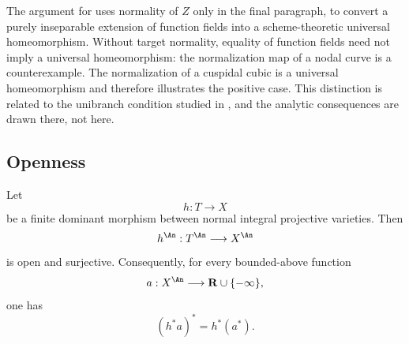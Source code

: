 \begin{remark}
\label{rem:ch41-radicial-uses}
The argument for  uses normality of $Z$
only in the final paragraph, to convert a purely inseparable extension of
function fields into a scheme-theoretic universal homeomorphism.  Without
target normality, equality of function fields need not imply a universal
homeomorphism: the normalization map of a nodal curve is a counterexample.
The normalization of a cuspidal cubic is a universal homeomorphism and
therefore illustrates the positive case.  This distinction is related to
the unibranch condition studied in
, and the analytic consequences are
drawn there, not here.
\end{remark}

\subsection{Openness}
\label{sec:ch41-openness}

\begin{lemma}\label{lem:bj-finite-normal-open}
Let
\[
                         h:T\longrightarrow X
\tag{41.5}\label{eq:bj-finite-map}
\]
be a finite dominant morphism between normal integral projective
varieties.  Then
\[
                         h^{\An}:T^{\An}\longrightarrow X^{\An}
\]
is open and surjective.  Consequently, for every bounded-above function
\[
                         a:X^{\An}\longrightarrow
                         \mathbf R\cup\{-\infty\},
\]
one has
\[
                         (h^*a)^*=h^*(a^*).
\tag{41.6}\label{eq:bj-finite-open-usc}
\]
\end{lemma}


